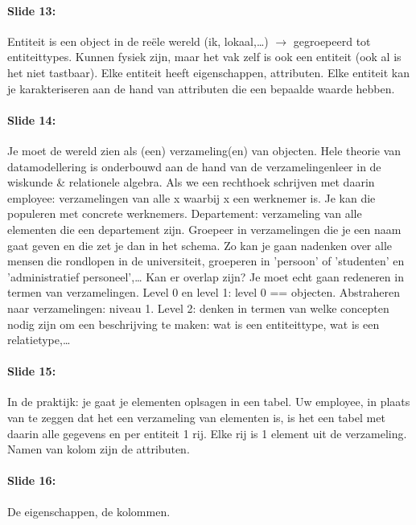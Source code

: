 \documentclass[10pt,a4paper]{report}
\begin{document}
\paragraph{Slide 13:}Entiteit is een object in de reële wereld (ik, lokaal,…) $\rightarrow$ gegroepeerd tot entiteittypes. Kunnen fysiek zijn, maar het vak zelf is ook een entiteit (ook al is het niet tastbaar). Elke entiteit heeft eigenschappen, attributen. Elke entiteit kan je karakteriseren aan de hand van attributen die een bepaalde waarde hebben. 

\paragraph{Slide 14:}Je moet de wereld zien als (een) verzameling(en) van objecten. Hele theorie van datamodellering is onderbouwd aan de hand van de verzamelingenleer in de wiskunde \& relationele algebra. Als we een rechthoek schrijven met daarin employee: verzamelingen van alle x waarbij x een werknemer is. Je kan die populeren met concrete werknemers. Departement: verzameling van alle elementen die een departement zijn. Groepeer in verzamelingen die je een naam gaat geven en die zet je dan in het schema. Zo kan je gaan nadenken over alle mensen die rondlopen in de universiteit, groeperen in 'persoon' of 'studenten' en 'administratief personeel',… Kan er overlap zijn? Je moet echt gaan redeneren in termen van verzamelingen. Level 0 en level 1: level 0 == objecten. Abstraheren naar verzamelingen: niveau 1. Level 2: denken in termen van welke concepten nodig zijn om een beschrijving te maken: wat is een entiteittype, wat is een relatietype,…

\paragraph{Slide 15:}In de praktijk: je gaat je elementen oplsagen in een tabel. Uw employee, in plaats van te zeggen dat het een verzameling van elementen is, is het een tabel met daarin alle gegevens en per entiteit 1 rij. Elke rij is 1 element uit de verzameling. Namen van kolom zijn de attributen.

\paragraph{Slide 16:}De eigenschappen, de kolommen.
\end{document}
